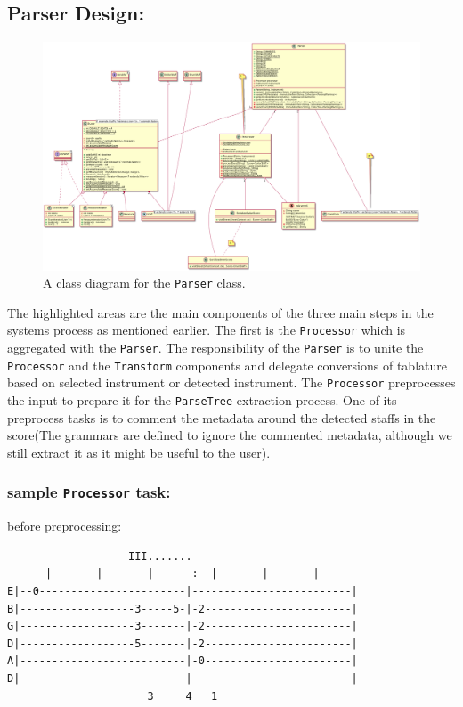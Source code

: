 \documentclass[11pt]{article}
\begin{document}
\subsection{Parser Design:}
\label{sec:org51738e1}
\begin{figure}[htbp]
\centering
\includegraphics[width=.9\linewidth]{./Diagrams/backend-parser-class-diagram.png}
\caption{A class diagram for the \texttt{Parser} class.}
\end{figure}

The highlighted areas are the main components of the three main steps in the systems process as mentioned earlier. The first is the \texttt{Processor} which is aggregated with the \texttt{Parser}. The responsibility of the \texttt{Parser} is to unite the \texttt{Processor} and the \texttt{Transform} components and delegate conversions of tablature based on selected instrument or detected instrument. The \texttt{Processor} preprocesses the input to prepare it for the \texttt{ParseTree} extraction process. One of its preprocess tasks is to comment the metadata around the detected staffs in the score(The grammars are defined to ignore the commented metadata, although we still extract it as it might be useful to the user). 


\subsubsection{sample \texttt{Processor} task:}
\label{sec:org4e2131d}
before preprocessing:
\begin{verbatim}
	               III.......
	  |       |       |      :  |       |       |
E|--0-----------------------|-------------------------|
B|------------------3-----5-|-2-----------------------|
G|------------------3-------|-2-----------------------|
D|------------------5-------|-2-----------------------|
A|--------------------------|-0-----------------------|
D|--------------------------|-------------------------|
	                  3     4   1
\end{verbatim}
\end{document}
